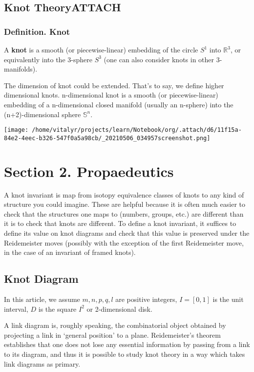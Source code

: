 \documentclass[a4paper]{article}
\begin{document}
\subsection{Knot Theory\hfill{}\textsc{ATTACH}}
\label{sec:orgb28444b}
\subsubsection{Definition. Knot}
\label{sec:org6a6736a}
A \textbf{knot} is a smooth (or piecewise-linear) embedding of the circle \(S^{1}\) into \(\mathbb{R}^{3}\), or equivalently into the 3-sphere \(S^{3}\) (one can also consider knots in other 3-manifolds).

The dimension of knot could be extended. That's to say, we define higher dimensional knots. n-dimensional knot is a smooth (or piecewise-linear) embedding of a n-dimensional closed manifold (usually an n-sphere) into the (n+2)-dimensional sphere \(\mathbb{S}^{n}\).


\begin{center}
\texttt{[image: /home/vitalyr/projects/learn/Notebook/org/.attach/d6/11f15a-84e2-4eec-b326-547f0a5a98cb/\_20210506\_034957screenshot.png]}
\end{center}

\section{Section 2. Propaedeutics}
\label{sec:org0b25654}
A knot invariant is map from isotopy equivalence classes of knots to any kind of structure you could imagine. These are helpful because it is often much easier to check that the structures one maps to (numbers, groups, etc.) are different than it is to check that knots are different. To define a knot invariant, it suffices to define its value on knot diagrams and check that this value is preserved under the Reidemeister moves (possibly with the exception of the first Reidemeister move, in the case of an invariant of framed knots).
\subsection{Knot Diagram}
\label{sec:org337781f}
In this article, we assume \(m, n, p, q, l\) are positive integers, \(I=[0,1]\) is the unit interval, \(D\) is the square \(I^{2}\) or 2-dimensional disk.

A link diagram is, roughly speaking, the combinatorial object obtained by projecting a link in ‘general position’ to a plane. Reidemeister's theorem establishes that one does not lose any essential information by passing from a link to its diagram, and thus it is possible to study knot theory in a way which takes link diagrams as primary.
\end{document}
